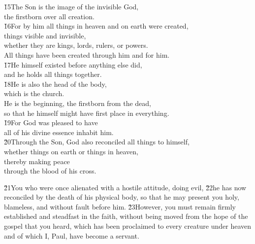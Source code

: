 \begin{poetry}
\poeml \v{15}The Son is the image of the invisible God, \\
\poemll    the firstborn over all creation. \\
\poeml \v{16}For by him all things in heaven and on earth were created, \\
\poemll    things visible and invisible, \\
\poemlll       whether they are kings, lords, rulers, or powers. \\
\poeml All things have been created through him and for him. \\
\poeml \v{17}He himself existed before anything else did, \\
\poemll    and he holds all things together. \\
\poeml \v{18}He is also the head of the body, \\
\poemll    which is the church. \\
\poeml He is the beginning, the firstborn from the dead, \\
\poemll    so that he himself might have first place in everything. \\
\poeml \v{19}For God was pleased to have \\
\poemll    all of his divine essence inhabit him. \\
\poeml \v{20}Through the Son, God also reconciled all things to himself, \\
\poemll    whether things on earth or things in heaven, \\
\poeml thereby making peace \\
\poemll    through the blood of his cross.
\end{poetry}

\v{21}You who were once alienated with a hostile attitude, doing evil, \v{22}he has now reconciled by the death of his physical body, so that he may present you holy, blameless, and without fault before him. \v{23}However, you must remain firmly established and steadfast in the faith, without being moved from the hope of the gospel that you heard, which has been proclaimed to every creature under heaven and of which I, Paul, have become a servant.

